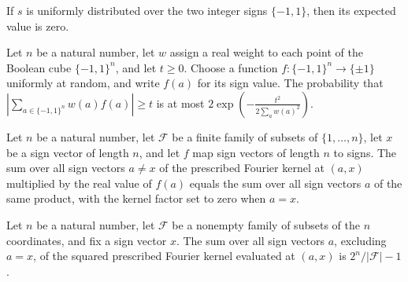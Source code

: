 \begin{theorem}
\label{FABL.integral_signValue_uniformPMF}
\leanok
{}
If $s$ is uniformly distributed over the two integer signs $\{-1,1\}$, then its expected
value is zero.
\end{theorem}

\begin{theorem}
\label{FABL.measure_abs_weightedBooleanSum_ge_le}
\leanok
{}
Let $n$ be a natural number, let $w$ assign a real weight to each point of the Boolean
cube $\{-1,1\}^n$, and let $t\ge 0$. Choose a function
$f:\{-1,1\}^n\to\{\pm1\}$ uniformly at random, and write $f(a)$ for its sign
value. The probability that $\left|\sum_{a\in\{-1,1\}^n} w(a)f(a)\right|\ge t$ is
at most $2\exp\left(-\frac{t^2}{2\sum_a w(a)^2}\right)$.
\end{theorem}

\begin{theorem}
\label{FABL.prescribedFourierOffCenterSum_eq_weightedSum}
\leanok
{}
Let $n$ be a natural number, let $\mathcal F$ be a finite family of subsets of
$\{1,\ldots,n\}$, let $x$ be a sign vector of length $n$, and let $f$ map sign vectors
of length $n$ to signs. The sum over all sign vectors $a\ne x$ of the prescribed Fourier
kernel at $(a,x)$ multiplied by the real value of $f(a)$ equals the sum over all sign
vectors $a$ of the same product, with the kernel factor set to zero when $a=x$.
\end{theorem}

\begin{theorem}
\label{FABL.sum_sq_prescribedFourierOffCenterWeight}
\leanok
{}
Let $n$ be a natural number, let $\mathcal F$ be a nonempty family of subsets of the $n$
coordinates, and fix a sign vector $x$. The sum over all sign vectors $a$, excluding
$a=x$, of the squared prescribed Fourier kernel evaluated at $(a,x)$ is $2^n/|\mathcal
F|-1$.
\end{theorem}

